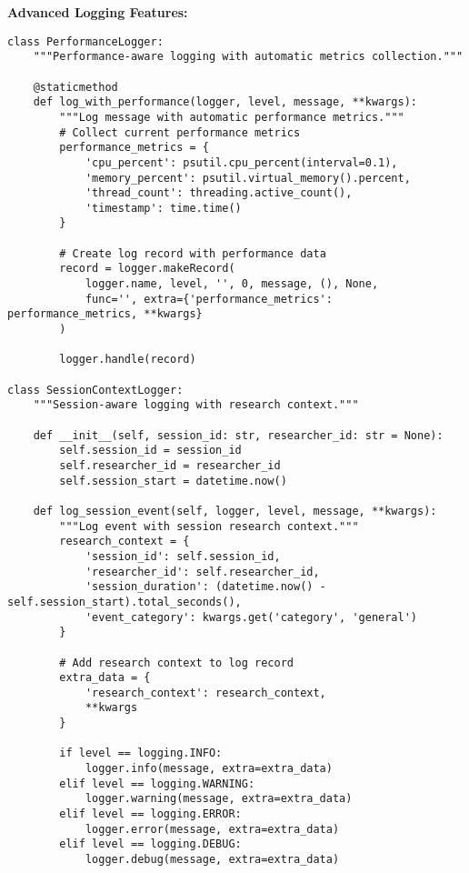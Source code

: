 \documentclass[12pt,a4paper]{article}
\begin{document}
\textbf{Advanced Logging Features:}

\begin{verbatim}
class PerformanceLogger:
    """Performance-aware logging with automatic metrics collection."""
    
    @staticmethod
    def log_with_performance(logger, level, message, **kwargs):
        """Log message with automatic performance metrics."""
        # Collect current performance metrics
        performance_metrics = {
            'cpu_percent': psutil.cpu_percent(interval=0.1),
            'memory_percent': psutil.virtual_memory().percent,
            'thread_count': threading.active_count(),
            'timestamp': time.time()
        }
        
        # Create log record with performance data
        record = logger.makeRecord(
            logger.name, level, '', 0, message, (), None, 
            func='', extra={'performance_metrics': performance_metrics, **kwargs}
        )
        
        logger.handle(record)

class SessionContextLogger:
    """Session-aware logging with research context."""
    
    def __init__(self, session_id: str, researcher_id: str = None):
        self.session_id = session_id
        self.researcher_id = researcher_id
        self.session_start = datetime.now()
        
    def log_session_event(self, logger, level, message, **kwargs):
        """Log event with session research context."""
        research_context = {
            'session_id': self.session_id,
            'researcher_id': self.researcher_id,
            'session_duration': (datetime.now() - self.session_start).total_seconds(),
            'event_category': kwargs.get('category', 'general')
        }
        
        # Add research context to log record
        extra_data = {
            'research_context': research_context,
            **kwargs
        }
        
        if level == logging.INFO:
            logger.info(message, extra=extra_data)
        elif level == logging.WARNING:
            logger.warning(message, extra=extra_data)
        elif level == logging.ERROR:
            logger.error(message, extra=extra_data)
        elif level == logging.DEBUG:
            logger.debug(message, extra=extra_data)
\end{verbatim}
\end{document}
